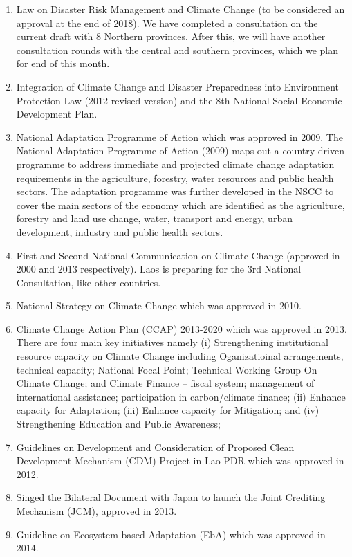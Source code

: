 \begin{enumerate}

\item Law on Disaster Risk Management and Climate Change (to be considered an approval at the end of 2018). We have completed a consultation on the current draft with 8 Northern provinces. After this, we will have another consultation rounds with the central and southern provinces, which we plan for end of this month.
\item Integration of Climate Change and Disaster Preparedness into Environment Protection Law (2012 revised version) and the 8th National Social-Economic Development Plan.
\item National Adaptation Programme of Action which was approved in 2009. The National Adaptation Programme of Action (2009) maps out a country-driven programme to address immediate and projected climate change adaptation requirements in the agriculture, forestry, water resources and public health sectors. The adaptation programme was further developed in the NSCC to cover the main sectors of the economy which are identified as the agriculture, forestry and land use change, water, transport and energy, urban development, industry and public health sectors. 
\item First and Second National Communication on Climate Change (approved in 2000 and 2013 respectively). Laos is preparing for the 3rd National Consultation, like other countries.
\item National Strategy on Climate Change which was approved in 2010.
\item Climate Change Action Plan (CCAP) 2013-2020 which was approved in 2013. There are four main key initiatives namely (i) Strengthening institutional resource capacity on Climate Change including Oganizatioinal arrangements, technical capacity; National Focal Point; Technical Working Group On Climate Change; and Climate Finance – fiscal system;  management of international assistance; participation in carbon/climate finance; (ii) Enhance capacity for Adaptation; (iii) Enhance capacity for Mitigation; and (iv)  Strengthening Education and Public Awareness;
\item Guidelines on Development and Consideration of Proposed Clean Development Mechanism (CDM) Project in Lao PDR which was approved in 2012.
\item Singed the Bilateral Document with Japan to launch the Joint Crediting Mechanism (JCM), approved in 2013. 
\item Guideline on Ecosystem based Adaptation (EbA) which was approved in 2014.

\end{enumerate}
